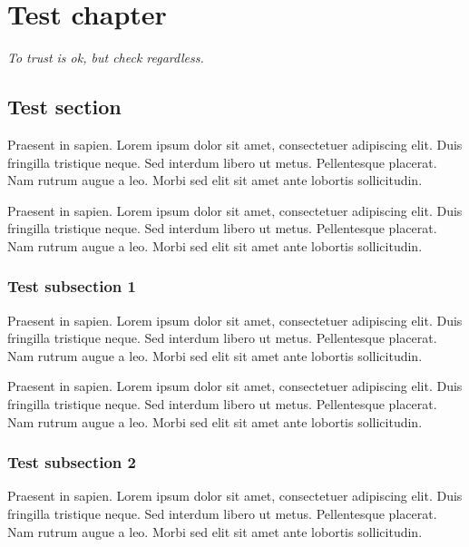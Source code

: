 

\chapter*{Test chapter}

\begin{flushright}
\parbox{0.6\textwidth}{
\emph{To trust is ok, but check regardless. \newline
{} } }
\end{flushright}

\section*{Test section}

Praesent in sapien. Lorem ipsum dolor sit amet, consectetuer adipiscing elit.
Duis fringilla tristique neque. Sed interdum libero ut metus. Pellentesque placerat.
Nam rutrum augue a leo. Morbi sed elit sit amet ante lobortis sollicitudin.

Praesent in sapien. Lorem ipsum dolor sit amet, consectetuer adipiscing elit.
Duis fringilla tristique neque. Sed interdum libero ut metus. Pellentesque placerat.
Nam rutrum augue a leo. Morbi sed elit sit amet ante lobortis sollicitudin.

\subsection*{Test subsection 1}
Praesent in sapien. Lorem ipsum dolor sit amet, consectetuer adipiscing elit.
Duis fringilla tristique neque. Sed interdum libero ut metus. Pellentesque placerat.
Nam rutrum augue a leo. Morbi sed elit sit amet ante lobortis sollicitudin.

Praesent in sapien. Lorem ipsum dolor sit amet, consectetuer adipiscing elit.
Duis fringilla tristique neque. Sed interdum libero ut metus. Pellentesque placerat.
Nam rutrum augue a leo. Morbi sed elit sit amet ante lobortis sollicitudin.

\subsection*{Test subsection 2}
Praesent in sapien. Lorem ipsum dolor sit amet, consectetuer adipiscing elit.
Duis fringilla tristique neque. Sed interdum libero ut metus. Pellentesque placerat.
Nam rutrum augue a leo. Morbi sed elit sit amet ante lobortis sollicitudin.


